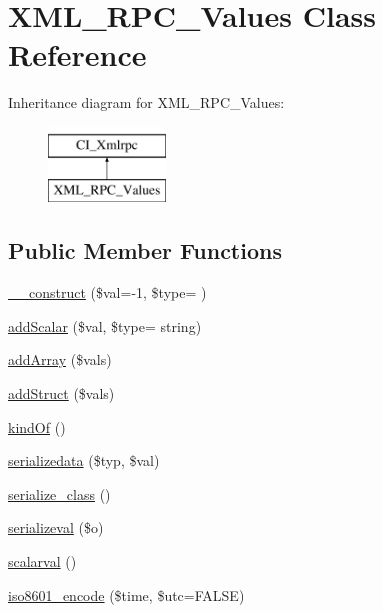 \hypertarget{class_x_m_l___r_p_c___values}{}\section{X\+M\+L\+\_\+\+R\+P\+C\+\_\+\+Values Class Reference}
\label{class_x_m_l___r_p_c___values}
Inheritance diagram for X\+M\+L\+\_\+\+R\+P\+C\+\_\+\+Values\+:\begin{figure}[H]
\begin{center}
\leavevmode
\includegraphics[height=2.000000cm]{class_x_m_l___r_p_c___values}
\end{center}
\end{figure}
\subsection*{Public Member Functions}
\begin{DoxyCompactItemize}
\item 
\hyperlink{class_x_m_l___r_p_c___values_a5e710df43bbe41b78847047548603ae9}{\+\_\+\+\_\+construct} (\$val=-\/1, \$type= \textquotesingle{}\textquotesingle{})
\item 
\hyperlink{class_x_m_l___r_p_c___values_ae3a567d6320b2a0e1e82c1fc2a546077}{add\+Scalar} (\$val, \$type= \textquotesingle{}string\textquotesingle{})
\item 
\hyperlink{class_x_m_l___r_p_c___values_a2081e6a72b7e1c15f8c1dbcdfa673d4c}{add\+Array} (\$vals)
\item 
\hyperlink{class_x_m_l___r_p_c___values_a5dbdf0121566791a201cd07a3de15531}{add\+Struct} (\$vals)
\item 
\hyperlink{class_x_m_l___r_p_c___values_a3b169c364729cee2afdccadef5229f80}{kind\+Of} ()
\item 
\hyperlink{class_x_m_l___r_p_c___values_a7058e00e310218c447d3c9fea0ee0a3d}{serializedata} (\$typ, \$val)
\item 
\hyperlink{class_x_m_l___r_p_c___values_a59df3d3c8fbb47a946d6a29f0b3c8e0c}{serialize\+\_\+class} ()
\item 
\hyperlink{class_x_m_l___r_p_c___values_a1a4bfc79985c185745d96ebe3a1e5c3d}{serializeval} (\$o)
\item 
\hyperlink{class_x_m_l___r_p_c___values_ac9a3751dc2d5479f409d0a4683c37d26}{scalarval} ()
\item 
\hyperlink{class_x_m_l___r_p_c___values_a201f99ae311bb2c53526933576c890d0}{iso8601\+\_\+encode} (\$time, \$utc=F\+A\+L\+S\+E)
\end{DoxyCompactItemize}
